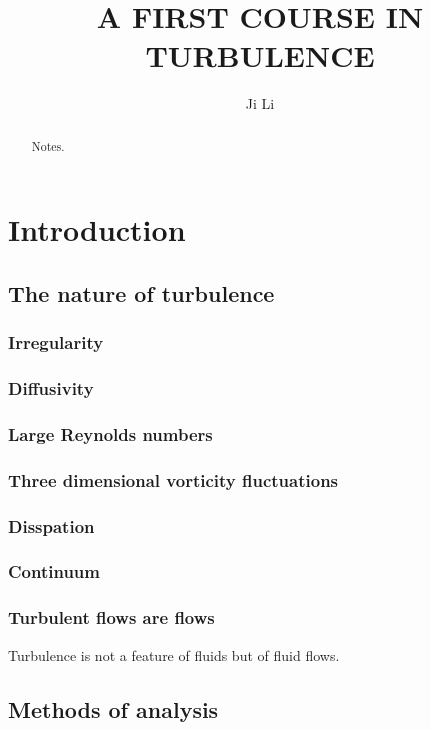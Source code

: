 \documentclass[review]{elsarticle}
\numberwithin{equation}{section}
\begin{document}
\begin{frontmatter}
	
\title{A FIRST COURSE IN TURBULENCE}
\author{Ji Li}


\address{National Key Laboratory of Science and Technology on Aerodynamic Design and Research, Northwestern Polytechnical 
University, Xi'an, Shaanxi 710072, China}

\begin{abstract}
	Notes.
\end{abstract}
\end{frontmatter}

\section{Introduction}
	\subsection{The nature of turbulence}
		\subsubsection {Irregularity}
		\subsubsection {Diffusivity}
		\subsubsection {Large Reynolds numbers}
		\subsubsection {Three dimensional vorticity fluctuations}
		\subsubsection {Disspation}
		\subsubsection {Continuum}
		\subsubsection {Turbulent flows are flows}
			Turbulence is not a feature of fluids but of fluid flows.
	\subsection{Methods of analysis}
\end{document}
